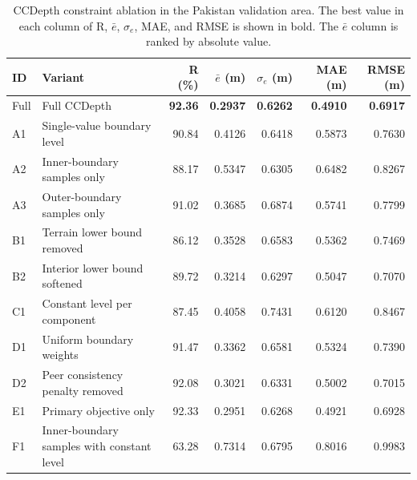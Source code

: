 \begingroup
\begin{table}[H]
\centering
\comparisonfont
\captionsetup{name=Table,font=comparisoncaption,labelfont=bf,labelsep=newline,justification=raggedright,singlelinecheck=false}
\caption{CCDepth constraint ablation in the Pakistan validation area. The best value in each column of R, $\bar e$, $\sigma_e$, MAE, and RMSE is shown in bold. The $\bar e$ column is ranked by absolute value.}
\label{tab:ccdepth_ablation}
\fontsize{8}{10}\selectfont
\setlength{\tabcolsep}{3pt}
\renewcommand{\arraystretch}{1.12}
\begin{tabular*}{\linewidth}{@{\extracolsep{\fill}}llrrrrr@{}}
\toprule
ID & Variant & R (\%) & $\bar e$ (m) & $\sigma_e$ (m) & MAE (m) & RMSE (m) \\
\midrule
Full & Full CCDepth & \textbf{92.36} & \textbf{0.2937} & \textbf{0.6262} & \textbf{0.4910} & \textbf{0.6917} \\
A1 & Single-value boundary level & 90.84 & 0.4126 & 0.6418 & 0.5873 & 0.7630 \\
A2 & Inner-boundary samples only & 88.17 & 0.5347 & 0.6305 & 0.6482 & 0.8267 \\
A3 & Outer-boundary samples only & 91.02 & 0.3685 & 0.6874 & 0.5741 & 0.7799 \\
B1 & Terrain lower bound removed & 86.12 & 0.3528 & 0.6583 & 0.5362 & 0.7469 \\
B2 & Interior lower bound softened & 89.72 & 0.3214 & 0.6297 & 0.5047 & 0.7070 \\
C1 & Constant level per component & 87.45 & 0.4058 & 0.7431 & 0.6120 & 0.8467 \\
D1 & Uniform boundary weights & 91.47 & 0.3362 & 0.6581 & 0.5324 & 0.7390 \\
D2 & Peer consistency penalty removed & 92.08 & 0.3021 & 0.6331 & 0.5002 & 0.7015 \\
E1 & Primary objective only & 92.33 & 0.2951 & 0.6268 & 0.4921 & 0.6928 \\
F1 & Inner-boundary samples with constant level & 63.28 & 0.7314 & 0.6795 & 0.8016 & 0.9983 \\
\bottomrule
\end{tabular*}
\end{table}
\endgroup
